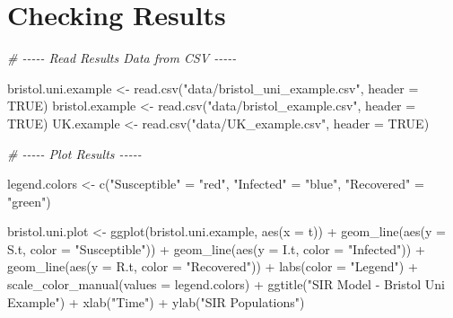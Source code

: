 \documentclass[
]{article}
\newenvironment{Shaded}{\begin{snugshade}}{\end{snugshade}}
\newcommand{\AttributeTok}[1]{\textcolor[rgb]{0.77,0.63,0.00}{#1}}
\newcommand{\CommentTok}[1]{\textcolor[rgb]{0.56,0.35,0.01}{\textit{#1}}}
\newcommand{\ConstantTok}[1]{\textcolor[rgb]{0.00,0.00,0.00}{#1}}
\newcommand{\FunctionTok}[1]{\textcolor[rgb]{0.00,0.00,0.00}{#1}}
\newcommand{\NormalTok}[1]{#1}
\newcommand{\OtherTok}[1]{\textcolor[rgb]{0.56,0.35,0.01}{#1}}
\newcommand{\SpecialCharTok}[1]{\textcolor[rgb]{0.00,0.00,0.00}{#1}}
\newcommand{\StringTok}[1]{\textcolor[rgb]{0.31,0.60,0.02}{#1}}
\begin{document}
\hypertarget{checking-results}{%
\section{Checking Results}\label{checking-results}}

\begin{Shaded}
\begin{Highlighting}[]
\CommentTok{\# {-}{-}{-}{-}{-} Read Results Data from CSV {-}{-}{-}{-}{-}}

\NormalTok{bristol.uni.example }\OtherTok{\textless{}{-}} \FunctionTok{read.csv}\NormalTok{(}\StringTok{"data/bristol\_uni\_example.csv"}\NormalTok{, }\AttributeTok{header =} \ConstantTok{TRUE}\NormalTok{)}
\NormalTok{bristol.example     }\OtherTok{\textless{}{-}} \FunctionTok{read.csv}\NormalTok{(}\StringTok{"data/bristol\_example.csv"}\NormalTok{, }\AttributeTok{header =} \ConstantTok{TRUE}\NormalTok{)}
\NormalTok{UK.example          }\OtherTok{\textless{}{-}} \FunctionTok{read.csv}\NormalTok{(}\StringTok{"data/UK\_example.csv"}\NormalTok{, }\AttributeTok{header =} \ConstantTok{TRUE}\NormalTok{)}



\CommentTok{\# {-}{-}{-}{-}{-} Plot Results {-}{-}{-}{-}{-}}

\NormalTok{legend.colors }\OtherTok{\textless{}{-}} \FunctionTok{c}\NormalTok{(}\StringTok{"Susceptible"} \OtherTok{=} \StringTok{"red"}\NormalTok{, }\StringTok{"Infected"} \OtherTok{=} \StringTok{"blue"}\NormalTok{, }\StringTok{"Recovered"} \OtherTok{=} \StringTok{"green"}\NormalTok{)}

\NormalTok{bristol.uni.plot }\OtherTok{\textless{}{-}} \FunctionTok{ggplot}\NormalTok{(bristol.uni.example, }\FunctionTok{aes}\NormalTok{(}\AttributeTok{x =}\NormalTok{ t)) }\SpecialCharTok{+}
  \FunctionTok{geom\_line}\NormalTok{(}\FunctionTok{aes}\NormalTok{(}\AttributeTok{y  =}\NormalTok{ S.t, }\AttributeTok{color =} \StringTok{"Susceptible"}\NormalTok{)) }\SpecialCharTok{+}
  \FunctionTok{geom\_line}\NormalTok{(}\FunctionTok{aes}\NormalTok{(}\AttributeTok{y  =}\NormalTok{ I.t, }\AttributeTok{color =} \StringTok{"Infected"}\NormalTok{)) }\SpecialCharTok{+}
  \FunctionTok{geom\_line}\NormalTok{(}\FunctionTok{aes}\NormalTok{(}\AttributeTok{y  =}\NormalTok{ R.t, }\AttributeTok{color =} \StringTok{"Recovered"}\NormalTok{)) }\SpecialCharTok{+}
  \FunctionTok{labs}\NormalTok{(}\AttributeTok{color =} \StringTok{"Legend"}\NormalTok{) }\SpecialCharTok{+}
  \FunctionTok{scale\_color\_manual}\NormalTok{(}\AttributeTok{values =}\NormalTok{ legend.colors) }\SpecialCharTok{+}
  \FunctionTok{ggtitle}\NormalTok{(}\StringTok{"SIR Model {-} Bristol Uni Example"}\NormalTok{) }\SpecialCharTok{+}
  \FunctionTok{xlab}\NormalTok{(}\StringTok{"Time"}\NormalTok{) }\SpecialCharTok{+}
  \FunctionTok{ylab}\NormalTok{(}\StringTok{"SIR Populations"}\NormalTok{)}


\end{Highlighting}
\end{Shaded}
\end{document}
